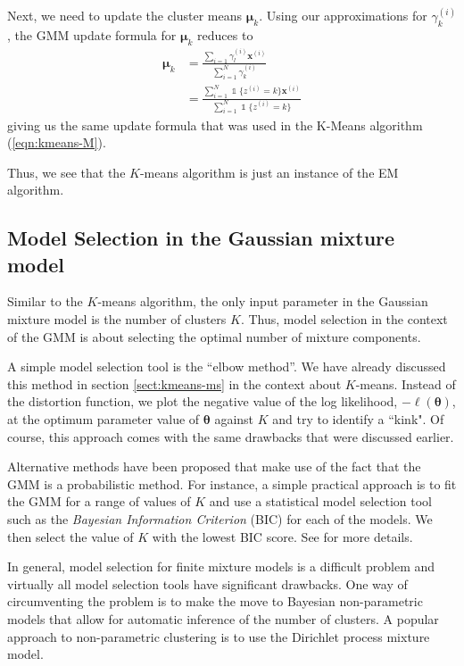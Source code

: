 \documentclass[final,3p,times,twocolumn]{elsarticle}
\let\bs\boldsymbol
\DeclareMathOperator*{\id}{\mathds{1}}
\begin{document}
Next, we need to update the cluster means $\boldsymbol \mu_k$.
Using our approximations for $\gamma_k^{(i)}$, the GMM update formula for $\boldsymbol \mu_k$ reduces to 
\begin{equation*}
\begin{split}
\bs \mu_k &= \frac{\sum_{i=1}\gamma_l^{(i)} \bs x^{(i)}}{\sum_{i=1}^N \gamma_k^{(i)}}\\
&= \frac{\sum_{i=1}^N \id\{z^{(i)}=k\} \bs x^{(i)}}{\sum_{i=1}^N \id\{z^{(i)} = k\}}
\end{split}
\end{equation*}
giving us the same update formula that was used in the K-Means algorithm (\ref{eqn:kmeans-M}).

Thus, we see that the $K$-means algorithm is just an instance of the EM algorithm.

\subsection{Model Selection in the Gaussian mixture model}
Similar to the $K$-means algorithm, the only input parameter in the Gaussian mixture model is the number of clusters $K$.
Thus, model selection in the context of the GMM is about selecting the optimal number of mixture components.



A simple model selection tool is the ``elbow method''.
We have already discussed this method in section \ref{sect:kmeans-ms} in the context about $K$-means.
Instead of the distortion function, we plot the negative value of the log likelihood, $-\ell(\bs\theta)$, at the optimum parameter value of $\bs\theta$ against $K$ and try to identify a ``kink".
Of course, this approach comes with the same drawbacks that were discussed earlier.

Alternative methods have been proposed that make use of the fact that the GMM is a probabilistic method.
For instance, a simple practical approach is to fit the GMM for a range of values of $K$ and use a statistical model selection tool such as the \emph{Bayesian Information Criterion} (BIC) for each of the models.
We then select the value of $K$ with the lowest BIC score.
See \cite{fraley2002} for more details.

In general, model selection for finite mixture models is a difficult problem and virtually all model selection tools have significant drawbacks. 
One way of circumventing the problem is to make the move to Bayesian non-parametric models that allow for automatic inference of the number of clusters.
A popular approach to non-parametric clustering is to use the Dirichlet process mixture model.
\end{document}
